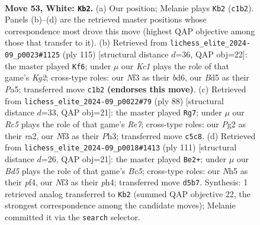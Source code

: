\documentclass[11pt]{article}
\begin{document}
\clearpage

\begin{figure}[p]\centering
\begin{subfigure}{0.46\textwidth}\centering
\resizebox{\linewidth}{!}{%
\newchessgame
\chessboard[
  setfen={3r4/8/1k6/2RB1p1N/1P6/3b1N2/6P1/2K5 w - - 2 53},
  showmover=false,
  pgfstyle=straightmove, color=movearrow, markmove={c1-b2}
]}
\caption{}
\end{subfigure}\hfill
\begin{subfigure}{0.46\textwidth}\centering
\resizebox{\linewidth}{!}{%
\newchessgame
\chessboard[
  setfen={8/6k1/3B4/p4p1K/2B1b1rp/1P6/8/8 b - - 4 58},
  showmover=false,
  pgfstyle=straightmove, color=movearrow, markmove={g7-f6}
]}
\caption{}
\end{subfigure}
\\[4pt]
\begin{subfigure}{0.46\textwidth}\centering
\resizebox{\linewidth}{!}{%
\newchessgame
\chessboard[
  setfen={8/4R3/3k2p1/6B1/p3K3/Pb5P/r7/8 w - - 4 45},
  showmover=false,
  pgfstyle=straightmove, color=movearrow, markmove={e7-g7}
]}
\caption{}
\end{subfigure}\hfill
\begin{subfigure}{0.46\textwidth}\centering
\resizebox{\linewidth}{!}{%
\newchessgame
\chessboard[
  setfen={8/4k3/1R6/4Bp1p/2b2P1P/1p6/2r5/3K4 b - - 14 56},
  showmover=false,
  pgfstyle=straightmove, color=movearrow, markmove={c4-e2}
]}
\caption{}
\end{subfigure}
\caption{\textbf{Move 53, White: \texttt{Kb2}.} (a) Our position; Melanie plays \texttt{Kb2} (\texttt{c1b2}). Panels (b)--(d) are the retrieved master positions whose correspondence most drove this move (highest QAP objective among those that transfer to it). (b) Retrieved from \texttt{lichess\_elite\_2024-09\_p0023\#1125} (ply 115) [structural distance $d$=36, QAP obj=22]: the master played \texttt{Kf6}; under $\mu$ our \emph{Kc1} plays the role of that game's \emph{Kg2}; cross-type roles: our \emph{N}f3 as their \emph{b}d6, our \emph{B}d5 as their \emph{P}a5; transferred move \texttt{c1b2} \textbf{(endorses this move)}. (c) Retrieved from \texttt{lichess\_elite\_2024-09\_p0022\#79} (ply 88) [structural distance $d$=33, QAP obj=21]: the master played \texttt{Rg7}; under $\mu$ our \emph{Rc5} plays the role of that game's \emph{Re7}; cross-type roles: our \emph{P}g2 as their \emph{r}a2, our \emph{N}f3 as their \emph{P}h3; transferred move \texttt{c5c8}. (d) Retrieved from \texttt{lichess\_elite\_2024-09\_p0018\#1413} (ply 111) [structural distance $d$=26, QAP obj=21]: the master played \texttt{Be2+}; under $\mu$ our \emph{Bd5} plays the role of that game's \emph{Bc5}; cross-type roles: our \emph{N}h5 as their \emph{p}f4, our \emph{N}f3 as their \emph{p}h4; transferred move \texttt{d5b7}. Synthesis: 1 retrieved analog transferred to \texttt{Kb2} (summed QAP objective 22, the strongest correspondence among the candidate moves); Melanie committed it via the \texttt{search} selector.}
\label{fig:thought-m104}
\end{figure}
\end{document}

